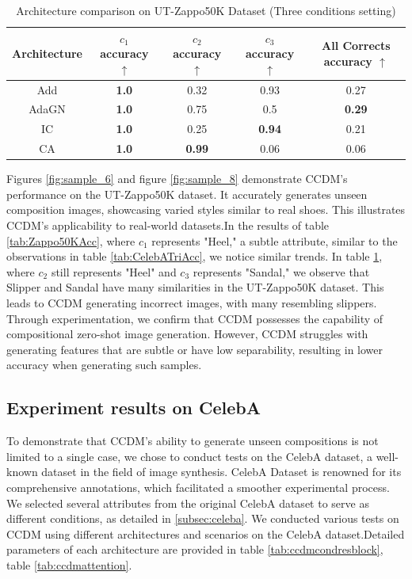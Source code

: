 \begin{table} [H]
    \centering
    \begin{tabular}{ccccc}
         Architecture & $c_1$ accuracy $\uparrow$ & $c_2$ accuracy $\uparrow$ & $c_3$ accuracy $\uparrow$ & All Corrects accuracy $\uparrow$ \\
         \hline
         Add  & \textbf{1.0} & 0.32 & 0.93 & 0.27\\
         AdaGN & \textbf{1.0} & 0.75 & 0.5 & \textbf{0.29}\\
         IC & \textbf{1.0} & 0.25 & \textbf{0.94} & 0.21\\
         CA & \textbf{1.0} & \textbf{0.99} & 0.06 & 0.06 \\
    \end{tabular}
    \caption{Architecture comparison on UT-Zappo50K Dataset (Three conditions setting)}
    \label{tab:Zappo50KTriAcc}
\end{table}

Figures \ref{fig:sample_6} and figure \ref{fig:sample_8} demonstrate CCDM's performance on the UT-Zappo50K dataset. It accurately generates unseen composition images, showcasing varied styles similar to real shoes. This illustrates CCDM's applicability to real-world datasets.In the results of table \ref{tab:Zappo50KAcc}, where $c_1$ represents "Heel," a subtle attribute, similar to the observations in table \ref{tab:CelebATriAcc}, we notice similar trends. In table \ref{tab:Zappo50KTriAcc}, where $c_2$ still represents "Heel" and $c_3$ represents "Sandal," we observe that Slipper and Sandal have many similarities in the UT-Zappo50K dataset. This leads to CCDM generating incorrect images, with many resembling slippers. Through experimentation, we confirm that CCDM possesses the capability of compositional zero-shot image generation. However, CCDM struggles with generating features that are subtle or have low separability, resulting in lower accuracy when generating such samples.


\subsection{Experiment results on CelebA}
To demonstrate that CCDM's ability to generate unseen compositions is not limited to a single case, we chose to conduct tests on the CelebA dataset, a well-known dataset in the field of image synthesis. CelebA Dataset is renowned for its comprehensive annotations, which facilitated a smoother experimental process. We selected several attributes from the original CelebA dataset to serve as different conditions, as detailed in \ref{subsec:celeba}. We conducted various tests on CCDM using different architectures and scenarios on the CelebA dataset.Detailed parameters of each architecture are provided in table \ref{tab:ccdmcondresblock}, table \ref{tab:ccdmattention}.

